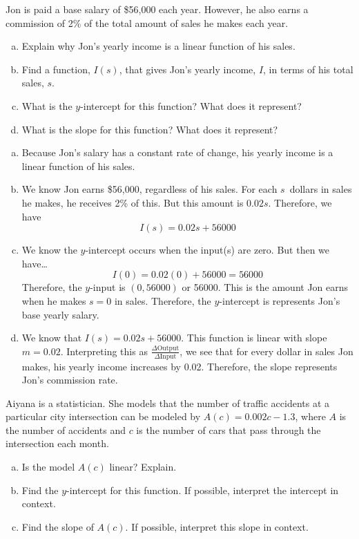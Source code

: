 \documentclass[11pt,letterpaper]{article}
\begin{document}
\newpage



 Jon is paid a base salary of \$56,000 each year. However, he also earns a commission of 2\% of the total amount of sales he makes each year. 
        \begin{enumerate}[(a)]
        \item Explain why Jon's yearly income is a linear function of his sales.
        \item Find a function, $I(s)$, that gives Jon's yearly income, $I$, in terms of his total sales, $s$.
        \item What is the $y$-intercept for this function? What does it represent?
        \item What is the slope for this function? What does it represent? 
        \end{enumerate} \pspace

\sol
\begin{enumerate}[(a)]
\item Because Jon's salary has a constant rate of change, his yearly income is a linear function of his sales. \pspace

\item We know Jon earns \$56,000, regardless of his sales. For each $s$~dollars in sales he makes, he receives 2\% of this. But this amount is $0.02s$. Therefore, we have
	\[
	I(s)= 0.02s + 56000
	\] \pspace

\item We know the $y$-intercept occurs when the input(s) are zero. But then we have\dots
	\[
	I(0)= 0.02(0) + 56000= 56000
	\]
Therefore, the $y$-input is $(0, 56000)$ or 56000. This is the amount Jon earns when he makes $s= 0$ in sales. Therefore, the $y$-intercept is represents Jon's base yearly salary. \pspace

\item We know that $I(s)= 0.02s + 56000$. This function is linear with slope $m= 0.02$. Interpreting this as $\frac{\Delta \text{Output}}{\Delta \text{Input}}$, we see that for every dollar in sales Jon makes, his yearly income increases by 0.02. Therefore, the slope represents Jon's commission rate. 
\end{enumerate}



\newpage



 Aiyana is a statistician. She models that the number of traffic accidents at a particular city intersection can be modeled by $A(c)= 0.002c - 1.3$, where $A$ is the number of accidents and $c$ is the number of cars that pass through the intersection each month. 
	\begin{enumerate}[(a)]
	\item Is the model $A(c)$ linear? Explain.
	\item Find the $y$-intercept for this function. If possible, interpret the intercept in context. 
	\item Find the slope of $A(c)$. If possible, interpret this slope in context. 
	\end{enumerate} \pspace
\end{document}
